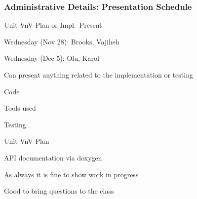 \documentclass[t,12pt,numbers,fleqn]{beamer}
\begin{document}

\begin{frame}
\frametitle{Administrative Details: Presentation Schedule}

\bi
\item Unit VnV Plan or Impl.\ Present
\bi
\item Wednesday (Nov 28): Brooks, Vajiheh
\item Wednesday (Dec 5): Olu, Karol
\ei
\item Can present anything related to the implementation or testing
\bi
\item Code
\item Tools used
\item Testing
\item Unit VnV Plan
\item API documentation via doxygen
\item As always it is fine to show work in progress
\item Good to bring questions to the class
\ei
\ei

\end{frame}





\end{document}
